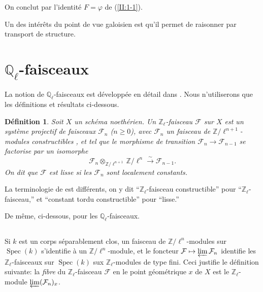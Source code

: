 \documentclass{book}
\DeclareMathOperator{\spec}{Spec}
\newcommand{\cF}{\mathcal{F}}
\newcommand{\dQ}{\mathbb{Q}}
\newcommand{\dZ}{\mathbb{Z}}
\newcommand{\iso}{\xrightarrow\sim}
\newtheorem{definition_}[subsection]{Définition}
\begin{document}
On conclut par l'identité $F=\varphi$ de (\ref{II:1-1}). 

Un des intérêts du point de vue galoisien est qu'il permet de raisonner par 
transport de structure. 










\section{\texorpdfstring{$\dQ_\ell$}{Ql}-faisceaux}\label{II:2}

La notion de $\dQ_\ell$-faisceaux est développée en détail dans 
\cite[V,VI]{SGA5}. Nous n'utiliserons que les définitions et résultats 
ci-dessous. 





\begin{definition_}\label{II:2-1}
Soit $X$ un schéma noethérien. Un $\dZ_\ell$-faisceau $\cF$ sur $X$ est un 
système projectif de faisceaux $\cF_n$ ($n\geqslant 0$), avec $\cF_n$ un 
faisceau de $\dZ/\ell^{n+1}$-modules constructibles \cite[IX.2]{4}, et tel que 
le morphisme de transition $\cF_n\to\cF_{n-1}$ se factorise par un isomorphe 
\[
  \cF_n\otimes_{\dZ/\ell^{n+1}} \dZ/\ell^n \iso \cF_{n-1}\text{.}
\]
On dit que $\cF$ est \emph{lisse} si les $\cF_n$ sont localement constants. 
\end{definition_}

La terminologie de \cite{SGA5} est différents, on y dit ``$\dZ_\ell$-faisceau 
constructible'' pour ``$\dZ_\ell$-faisceau,'' et ``constant tordu 
constructible'' pour ``lisse.'' 

De même, ci-dessous, pour les $\dQ_\ell$-faisceaux. 





\subsection{}\label{II:2-2}

Si $k$ est un corps séparablement clos, un faisceau de $\dZ/\ell^n$-modules 
sur $\spec(k)$ s'identifie à un $\dZ/\ell^n$-module, et le foncteur 
$\cF\mapsto \varprojlim \cF_n$ identifie les $\dZ_\ell$-faisceaux sur 
$\spec(k)$ sux $\dZ_\ell$-modules de type fini. Ceci justifie le définition 
suivante: la \emph{fibre} du $\dZ_\ell$-faisceau $\cF$ en le point 
géométrique $x$ de $X$ est le $\dZ_\ell$-module $\varprojlim (\cF_n)_x$. 
\end{document}
